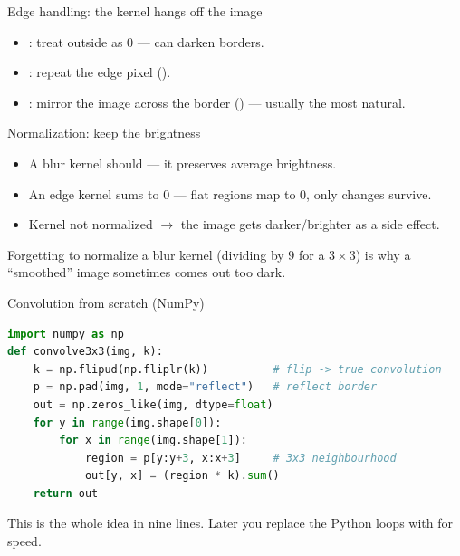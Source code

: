 \documentclass[10pt,aspectratio=169]{beamer}
\begin{document}
\begin{frame}{Edge handling: the kernel hangs off the image}
  \begin{center}
  \end{center}
  \begin{itemize}
    \item {}: treat outside as 0 — can darken borders.
    \item {}: repeat the edge pixel ().
    \item {}: mirror the image across the border () — usually the most natural.
  \end{itemize}
\end{frame}

\begin{frame}{Normalization: keep the brightness}
  \begin{itemize}
    \item A blur kernel should  — it preserves average brightness.
    \item An edge kernel sums to 0 — flat regions map to 0, only changes survive.
    \item Kernel not normalized $\rightarrow$ the image gets darker/brighter as a side effect.
  \end{itemize}
  \begin{badbox}
    Forgetting to normalize a blur kernel (dividing by $9$ for a $3\times3$) is why a
    ``smoothed'' image sometimes comes out too dark.
  \end{badbox}
\end{frame}

\begin{frame}[fragile]{Convolution from scratch (NumPy)}
\begin{lstlisting}[language=Python]
import numpy as np
def convolve3x3(img, k):
    k = np.flipud(np.fliplr(k))          # flip -> true convolution
    p = np.pad(img, 1, mode="reflect")   # reflect border
    out = np.zeros_like(img, dtype=float)
    for y in range(img.shape[0]):
        for x in range(img.shape[1]):
            region = p[y:y+3, x:x+3]     # 3x3 neighbourhood
            out[y, x] = (region * k).sum()
    return out
\end{lstlisting}
  This is the whole idea in nine lines. Later you replace the Python loops with  for speed.
\end{frame}
\end{document}
